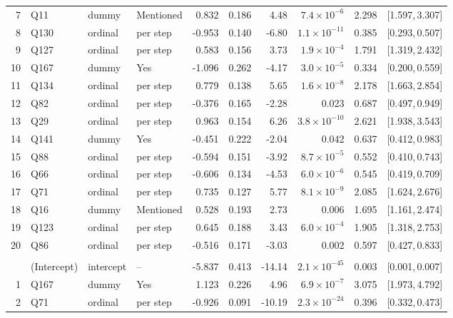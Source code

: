 \begin{landscape}
\begin{longtable}{r l l l r r r r r c}
7 & Q11 & dummy & Mentioned & 0.832 & 0.186 & 4.48 & $7.4{\times}10^{-6}$ & 2.298 & [1.597,\,3.307] &  \\
8 & Q130 & ordinal & per step & -0.953 & 0.140 & -6.80 & $1.1{\times}10^{-11}$ & 0.385 & [0.293,\,0.507] &  \\
9 & Q127 & ordinal & per step & 0.583 & 0.156 & 3.73 & $1.9{\times}10^{-4}$ & 1.791 & [1.319,\,2.432] &  \\
10 & Q167 & dummy & Yes & -1.096 & 0.262 & -4.17 & $3.0{\times}10^{-5}$ & 0.334 & [0.200,\,0.559] &  \\
11 & Q134 & ordinal & per step & 0.779 & 0.138 & 5.65 & $1.6{\times}10^{-8}$ & 2.178 & [1.663,\,2.854] &  \\
12 & Q82 & ordinal & per step & -0.376 & 0.165 & -2.28 & 0.023 & 0.687 & [0.497,\,0.949] &  \\
13 & Q29 & ordinal & per step & 0.963 & 0.154 & 6.26 & $3.8{\times}10^{-10}$ & 2.621 & [1.938,\,3.543] &  \\
14 & Q141 & dummy & Yes & -0.451 & 0.222 & -2.04 & 0.042 & 0.637 & [0.412,\,0.983] &  \\
15 & Q88 & ordinal & per step & -0.594 & 0.151 & -3.92 & $8.7{\times}10^{-5}$ & 0.552 & [0.410,\,0.743] &  \\
16 & Q66 & ordinal & per step & -0.606 & 0.134 & -4.53 & $6.0{\times}10^{-6}$ & 0.545 & [0.419,\,0.709] &  \\
17 & Q71 & ordinal & per step & 0.735 & 0.127 & 5.77 & $8.1{\times}10^{-9}$ & 2.085 & [1.624,\,2.676] &  \\
18 & Q16 & dummy & Mentioned & 0.528 & 0.193 & 2.73 & 0.006 & 1.695 & [1.161,\,2.474] &  \\
19 & Q123 & ordinal & per step & 0.645 & 0.188 & 3.43 & $6.0{\times}10^{-4}$ & 1.905 & [1.318,\,2.753] &  \\
20 & Q86 & ordinal & per step & -0.516 & 0.171 & -3.03 & 0.002 & 0.597 & [0.427,\,0.833] &  \\
\addlinespace[4pt]
\multicolumn{9}{l}{\textbf{Cluster 3} \quad \small $n = 2579$ ($n_{\text{in}} = 1048$), AIC $= 1494.3$, residual deviance $= 1452.3$ on 2558 df}\\[2pt]
 & (Intercept) & intercept & -- & -5.837 & 0.413 & -14.14 & $2.1{\times}10^{-45}$ & 0.003 & [0.001,\,0.007] &  \\
1 & Q167 & dummy & Yes & 1.123 & 0.226 & 4.96 & $6.9{\times}10^{-7}$ & 3.075 & [1.973,\,4.792] &  \\
2 & Q71 & ordinal & per step & -0.926 & 0.091 & -10.19 & $2.3{\times}10^{-24}$ & 0.396 & [0.332,\,0.473] &  \\

\end{longtable}
\end{landscape}

